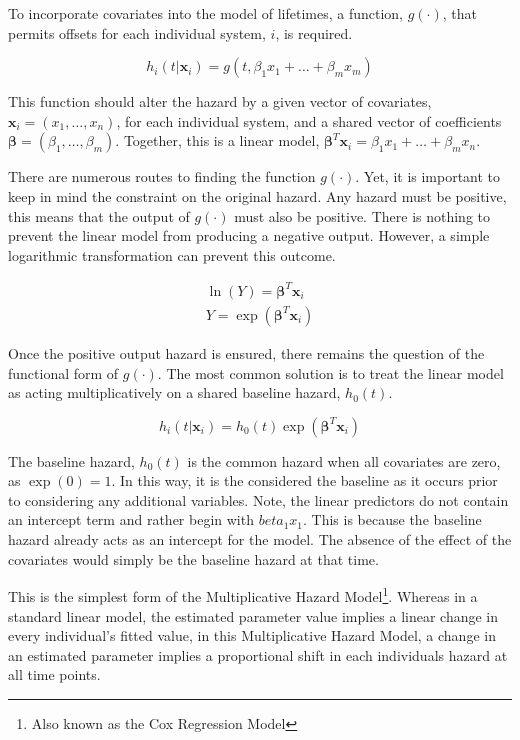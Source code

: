 To incorporate covariates into the model of lifetimes, a function, $g(\cdot)$, that permits offsets for each individual system, $i$, is required\cite{Cleves2008}\cite{Tableman2004}.

$$ h_i(t|\textbf{x}_i) = g(t, \beta_1 x_1 + \dots + \beta_m x_m)  $$


This function should alter the hazard by a given vector of covariates, $\textbf{x}_i = (x_1, \dots, x_n)$, for each individual system, and a shared vector of coefficients $\boldsymbol\beta = (\beta_1, \dots, \beta_m)$. Together, this is a linear model, $\boldsymbol\beta^T \textbf{x}_i = \beta_1 x_1 + \dots + \beta_m x_n$.

There are numerous routes to finding the function $g(\cdot)$. Yet, it is important to keep in mind the constraint on the original hazard. Any hazard must be positive, this means that the output of $g(\cdot)$ must also be positive. There is nothing to prevent the linear model from producing a negative output. However, a simple logarithmic transformation can prevent this outcome.

\begin{align*}
\ln(Y) = \boldsymbol\beta^T \textbf{x}_i \\
Y = \exp(\boldsymbol\beta^T \textbf{x}_i)
\end{align*}

Once the positive output hazard is ensured, there remains the question of the functional form of $g(\cdot)$. The most common solution is to treat the linear model as acting multiplicatively on a shared baseline hazard, $h_0(t)$.

$$ h_i(t|\textbf{x}_i) = h_0(t) \exp(\boldsymbol\beta^T \textbf{x}_i) $$

The baseline hazard, $h_0(t)$ is the common hazard when all covariates are zero, as $\exp(0) = 1$. In this way, it is the considered the baseline as it occurs prior to considering any additional variables\cite{Kleinbaum2005}. Note, the linear predictors do not contain an intercept term and rather begin with $beta_1 x_1$. This is because the baseline hazard already acts as an intercept for the model. The absence of the effect of the covariates would simply be the baseline hazard at that time.

This is the simplest form of the Multiplicative Hazard Model\footnote{Also known as the Cox Regression Model}. Whereas in a standard linear model, the estimated parameter value implies a linear change in every individual's fitted value, in this Multiplicative Hazard Model, a change in an estimated parameter implies a proportional shift in each individuals hazard at all time points\cite{Mason2015}.


